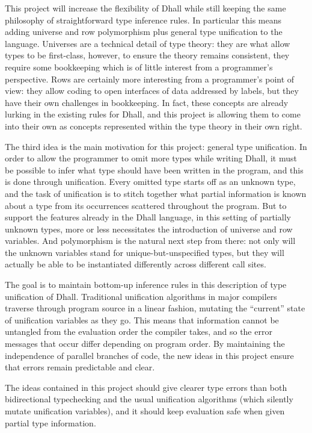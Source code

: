 \documentclass[11pt, twoside, reqno]{book}
\begin{document}
This project will increase the flexibility of Dhall while still keeping the same philosophy of straightforward type inference rules.
In particular this means adding universe and row polymorphism plus general type unification to the language.
Universes are a technical detail of type theory: they are what allow types to be first-class, however, to ensure the theory remains consistent, they require some bookkeeping which is of little interest from a programmer's perspective.
Rows are certainly more interesting from a programmer's point of view: they allow coding to open interfaces of data addressed by labels, but they have their own challenges in bookkeeping.
In fact, these concepts are already lurking in the existing rules for Dhall, and this project is allowing them to come into their own as concepts represented within the type theory in their own right.

The third idea is the main motivation for this project: general type unification.
In order to allow the programmer to omit more types while writing Dhall, it must be possible to infer what type should have been written in the program, and this is done through unification.
Every omitted type starts off as an unknown type, and the task of unification is to stitch together what partial information is known about a type from its occurrences scattered throughout the program.
But to support the features already in the Dhall language, in this setting of partially unknown types, more or less necessitates the introduction of universe and row variables.
And polymorphism is the natural next step from there: not only will the unknown variables stand for unique-but-unspecified types, but they will actually be able to be instantiated differently across different call sites.

The goal is to maintain bottom-up inference rules in this description of type unification of Dhall.
Traditional unification algorithms in major compilers traverse through program source in a linear fashion, mutating the ``current'' state of unification variables as they go.
This means that information cannot be untangled from the evaluation order the compiler takes, and so the error messages that occur differ depending on program order.
By maintaining the independence of parallel branches of code, the new ideas in this project ensure that errors remain predictable and clear.

The ideas contained in this project should give clearer type errors than both bidirectional typechecking and the usual unification algorithms (which silently mutate unification variables), and it should keep evaluation safe when given partial type information.
\end{document}
